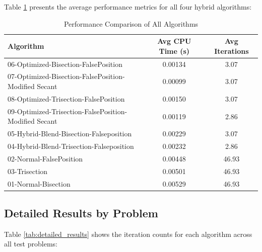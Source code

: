 \documentclass[11pt,a4paper]{article}
\begin{document}
Table \ref{tab:performance_comparison} presents the average performance metrics for all four hybrid algorithms:

\begin{table}[H]
\centering
\caption{Performance Comparison of All Algorithms}
\label{tab:performance_comparison}
\begin{tabular}{lcc}
\toprule
Algorithm & Avg CPU Time (s) & Avg Iterations \\
\midrule
06-Optimized-Bisection-FalsePosition & 0.00134 & 3.07 \\
07-Optimized-Bisection-FalsePosition-Modified Secant & 0.00099 & 3.07 \\
08-Optimized-Trisection-FalsePosition & 0.00150 & 3.07 \\
09-Optimized-Trisection-FalsePosition-Modified Secant & 0.00119 & 2.86 \\
05-Hybrid-Blend-Bisection-Falseposition & 0.00229 & 3.07 \\
04-Hybrid-Blend-Trisection-Falseposition & 0.00232 & 2.86 \\
02-Normal-FalsePosition & 0.00448 & 46.93 \\
03-Trisection & 0.00501 & 46.93 \\
01-Normal-Bisection & 0.00529 & 46.93 \\
\bottomrule
\end{tabular}
\end{table}

\subsection{Detailed Results by Problem}

Table \ref{tab:detailed_results} shows the iteration counts for each algorithm across all test problems:
\end{document}
